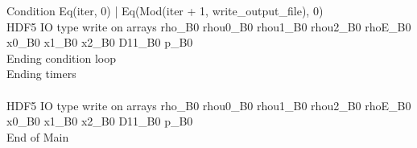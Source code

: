 \documentclass{article}
\begin{document}
\noindent Condition Eq(iter, 0) | Eq(Mod(iter + 1, write_output_file), 0)\\\noindent HDF5 IO type write on arrays rho_B0 rhou0_B0 rhou1_B0 rhou2_B0 rhoE_B0 x0_B0 x1_B0 x2_B0 D11_B0 p_B0\\\noindent Ending condition loop %
\\\noindent Ending timers\\
\\\noindent HDF5 IO type write on arrays rho_B0 rhou0_B0 rhou1_B0 rhou2_B0 rhoE_B0 x0_B0 x1_B0 x2_B0 D11_B0 p_B0\\\noindent End of Main\\
\end{document}
